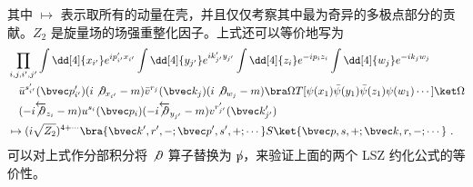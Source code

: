 其中 $\mapsto$ 表示取所有的动量在壳，并且仅仅考察其中最为奇异的多极点部分的贡献。$Z_2$ 是旋量场的场强重整化因子。上式还可以等价地写为
\begin{equation}
\begin{aligned}
&
\prod_{i,j,i',j'}
\int \dd[4]{x_{i'}} e^{ip'_{i'}x_{i'}}
\int \dd[4]{y_{j'}} e^{ik'_{j'}y_{j'}}
\int \dd[4]{z_{i}}e^{-ip_{i}z_{i}}
\int \dd[4]{w_{j}}e^{-ik_{j}w_{j}}
\\
&
\quad \bar u^{s'_{i'}}(\bvec p'_{i'})(i\not \partial_{x_{i'}}-m) \bar v^{r_{j}}(\bvec k_{j})(i\not \partial_{w_{j}}-m) 
\bra\Omega T[\psi(x_1)\bar\psi(y_1)\bar\psi(z_1)\psi(w_1)\cdots]\ket \Omega \\
&
\quad (-i\overleftarrow{\not \partial}_{z_i} -m )u^{s_i}(\bvec p_i) (-i\overleftarrow{\not \partial}_{y_{j'}}-m) v^{r'_{j'}}(\bvec k'_{j'})
\\
&
\mapsto 
(i\sqrt{Z_2})^{4+\cdots} \bra{\bvec k',r',-;\bvec p',s',+;\cdots} S \ket{\bvec p,s,+;\bvec k,r,-;\cdots}~.
\end{aligned}
\end{equation}
可以对上式作分部积分将 $\not\partial$ 算子替换为 $\not p$，来验证上面的两个 LSZ 约化公式的等价性。
